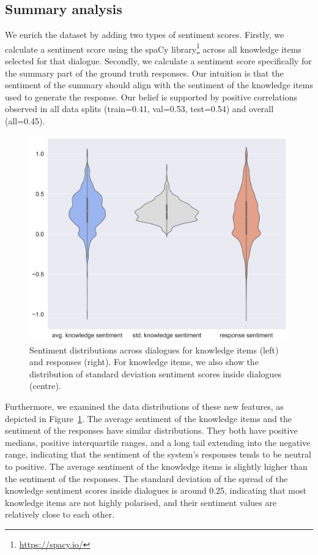 \documentclass[11pt]{article}
\begin{document}
\subsection{Summary analysis}
We enrich the dataset by adding two types of sentiment scores. Firstly, we calculate a sentiment score using the spaCy library\footnote{\url{https://spacy.io/}} across all knowledge items selected for that dialogue. Secondly, we calculate a sentiment score specifically for the summary part of the ground truth responses. Our intuition is that the sentiment of the summary should align with the sentiment of the knowledge items used to generate the response. Our belief is supported by positive correlations observed in all data splits (train=0.41, val=0.53, test=0.54) and overall (all=0.45).

\begin{figure}[!h]
    \centering
    \includegraphics[width=.45\textwidth]{images/distributions_sentiment.png}
    \caption{Sentiment distributions across dialogues for knowledge items (left) and responses (right). For knowledge items, we also show the distribution of standard deviation sentiment scores inside dialogues (centre).}
    \label{fig:distribution_sentiment}
\end{figure}

Furthermore, we examined the data distributions of these new features, as depicted in Figure~\ref{fig:distribution_sentiment}.
The average sentiment of the knowledge items and the sentiment of the responses have similar distributions. They both have positive medians, positive interquartile ranges, and a long tail extending into the negative range, indicating that the sentiment of the system's responses tends to be neutral to positive.
The average sentiment of the knowledge items is slightly higher than the sentiment of the responses.
The standard deviation of the spread of the knowledge sentiment scores inside dialogues is around 0.25, indicating that most knowledge items are not highly polarised, and their sentiment values are relatively close to each other.
\end{document}
